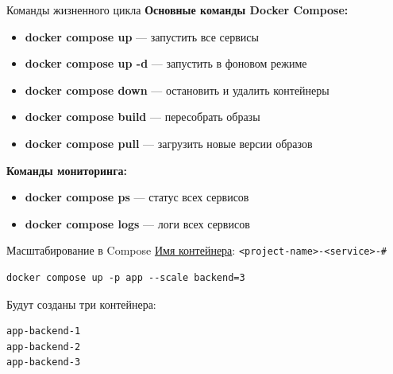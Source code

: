 \documentclass[aspectratio=169]{beamer}
\begin{document}
\begin{frame}{Команды жизненного цикла}
  \textbf{Основные команды Docker Compose:}

  \begin{itemize}
    \item \textbf{docker compose up} — запустить все сервисы
    \item \textbf{docker compose up -d} — запустить в фоновом режиме
    \item \textbf{docker compose down} — остановить и удалить контейнеры
    \item \textbf{docker compose build} — пересобрать образы
    \item \textbf{docker compose pull} — загрузить новые версии образов
  \end{itemize}

  \vspace{0.2cm}

  \textbf{Команды мониторинга:}
  \begin{itemize}
    \item \textbf{docker compose ps} — статус всех сервисов
    \item \textbf{docker compose logs} — логи всех сервисов
  \end{itemize}
\end{frame}


\begin{frame}[fragile]{Масштабирование в Compose}
\href{https://docs.docker.com/compose/how-tos/environment-variables/envvars/#project-and-file-configuration}{Имя контейнера}: \texttt{<project-name>-<service>-\#}
\vspace{0.2cm}

\begin{verbatim}
docker compose up -p app --scale backend=3
\end{verbatim}

\vspace{0.2cm}

Будут созданы три контейнера:
\begin{verbatim}
app-backend-1
app-backend-2
app-backend-3
\end{verbatim}
\end{frame}
\end{document}
